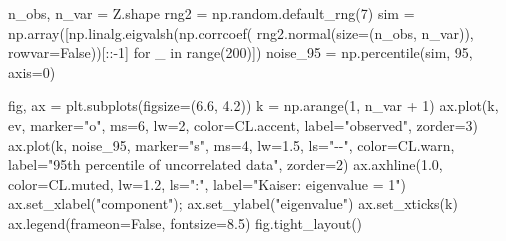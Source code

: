 \documentclass[
  letterpaper,
  10pt,
  twoside,
  openright,
  numbers=noenddot,
  chapterprefix=true]{scrbook}
\newenvironment{Shaded}{}{}
\newcommand{\BuiltInTok}[1]{\textcolor[rgb]{0.84,0.23,0.29}{#1}}
\newcommand{\ControlFlowTok}[1]{\textcolor[rgb]{0.84,0.23,0.29}{#1}}
\newcommand{\DecValTok}[1]{\textcolor[rgb]{0.00,0.36,0.77}{#1}}
\newcommand{\FloatTok}[1]{\textcolor[rgb]{0.00,0.36,0.77}{#1}}
\newcommand{\KeywordTok}[1]{\textcolor[rgb]{0.84,0.23,0.29}{#1}}
\newcommand{\NormalTok}[1]{\textcolor[rgb]{0.14,0.16,0.18}{#1}}
\newcommand{\OperatorTok}[1]{\textcolor[rgb]{0.14,0.16,0.18}{#1}}
\newcommand{\StringTok}[1]{\textcolor[rgb]{0.01,0.18,0.38}{#1}}
\newcommand{\VariableTok}[1]{\textcolor[rgb]{0.89,0.38,0.04}{#1}}
\begin{document}
\begin{Shaded}
\begin{Highlighting}[]
\NormalTok{n\_obs, n\_var }\OperatorTok{=}\NormalTok{ Z.shape}
\NormalTok{rng2 }\OperatorTok{=}\NormalTok{ np.random.default\_rng(}\DecValTok{7}\NormalTok{)}
\NormalTok{sim }\OperatorTok{=}\NormalTok{ np.array([np.linalg.eigvalsh(np.corrcoef(}
\NormalTok{    rng2.normal(size}\OperatorTok{=}\NormalTok{(n\_obs, n\_var)), rowvar}\OperatorTok{=}\VariableTok{False}\NormalTok{))[::}\OperatorTok{{-}}\DecValTok{1}\NormalTok{] }\ControlFlowTok{for}\NormalTok{ \_ }\KeywordTok{in} \BuiltInTok{range}\NormalTok{(}\DecValTok{200}\NormalTok{)])}
\NormalTok{noise\_95 }\OperatorTok{=}\NormalTok{ np.percentile(sim, }\DecValTok{95}\NormalTok{, axis}\OperatorTok{=}\DecValTok{0}\NormalTok{)}

\NormalTok{fig, ax }\OperatorTok{=}\NormalTok{ plt.subplots(figsize}\OperatorTok{=}\NormalTok{(}\FloatTok{6.6}\NormalTok{, }\FloatTok{4.2}\NormalTok{))}
\NormalTok{k }\OperatorTok{=}\NormalTok{ np.arange(}\DecValTok{1}\NormalTok{, n\_var }\OperatorTok{+} \DecValTok{1}\NormalTok{)}
\NormalTok{ax.plot(k, ev, marker}\OperatorTok{=}\StringTok{"o"}\NormalTok{, ms}\OperatorTok{=}\DecValTok{6}\NormalTok{, lw}\OperatorTok{=}\DecValTok{2}\NormalTok{, color}\OperatorTok{=}\NormalTok{CL.accent, label}\OperatorTok{=}\StringTok{"observed"}\NormalTok{, zorder}\OperatorTok{=}\DecValTok{3}\NormalTok{)}
\NormalTok{ax.plot(k, noise\_95, marker}\OperatorTok{=}\StringTok{"s"}\NormalTok{, ms}\OperatorTok{=}\DecValTok{4}\NormalTok{, lw}\OperatorTok{=}\FloatTok{1.5}\NormalTok{, ls}\OperatorTok{=}\StringTok{"{-}{-}"}\NormalTok{, color}\OperatorTok{=}\NormalTok{CL.warn,}
\NormalTok{        label}\OperatorTok{=}\StringTok{"95th percentile of uncorrelated data"}\NormalTok{, zorder}\OperatorTok{=}\DecValTok{2}\NormalTok{)}
\NormalTok{ax.axhline(}\FloatTok{1.0}\NormalTok{, color}\OperatorTok{=}\NormalTok{CL.muted, lw}\OperatorTok{=}\FloatTok{1.2}\NormalTok{, ls}\OperatorTok{=}\StringTok{":"}\NormalTok{, label}\OperatorTok{=}\StringTok{"Kaiser: eigenvalue = 1"}\NormalTok{)}
\NormalTok{ax.set\_xlabel(}\StringTok{"component"}\NormalTok{)}\OperatorTok{;}\NormalTok{ ax.set\_ylabel(}\StringTok{"eigenvalue"}\NormalTok{)}
\NormalTok{ax.set\_xticks(k)}
\NormalTok{ax.legend(frameon}\OperatorTok{=}\VariableTok{False}\NormalTok{, fontsize}\OperatorTok{=}\FloatTok{8.5}\NormalTok{)}
\NormalTok{fig.tight\_layout()}


\end{Highlighting}
\end{Shaded}
\end{document}
